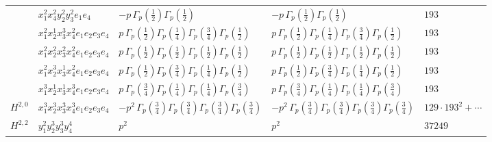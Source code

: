 \documentclass[11pt]{article}
\begin{document}
\begin{table}[ht]
{\begin{tabular}{@{}lllll@{}}
 & $x_{1}^{2} x_{4}^{2} y_{2}^{2} y_{3}^{2} e_{1} e_{4}$ & $- p \, \Gamma_p \left( \frac{1}{2} \right) \Gamma_p \left( \frac{1}{2} \right)$ & $- p \, \Gamma_p \left( \frac{1}{2} \right) \Gamma_p \left( \frac{1}{2} \right)$ & $193$ \\
 & $x_{1}^{2} x_{2}^{1} x_{3}^{3} x_{4}^{2}  e_{1} e_{2} e_{3} e_{4}$ & $p \, \Gamma_p \left( \frac{1}{2} \right) \Gamma_p \left( \frac{1}{4} \right) \Gamma_p \left( \frac{3}{4} \right) \Gamma_p \left( \frac{1}{2} \right)$ & $p \, \Gamma_p \left( \frac{1}{2} \right) \Gamma_p \left( \frac{1}{4} \right) \Gamma_p \left( \frac{3}{4} \right) \Gamma_p \left( \frac{1}{2} \right)$ & $193$ \\
 & $x_{1}^{2} x_{2}^{2} x_{3}^{2} x_{4}^{2}  e_{1} e_{2} e_{3} e_{4}$ & $p \, \Gamma_p \left( \frac{1}{2} \right) \Gamma_p \left( \frac{1}{2} \right) \Gamma_p \left( \frac{1}{2} \right) \Gamma_p \left( \frac{1}{2} \right)$ & $p \, \Gamma_p \left( \frac{1}{2} \right) \Gamma_p \left( \frac{1}{2} \right) \Gamma_p \left( \frac{1}{2} \right) \Gamma_p \left( \frac{1}{2} \right)$ & $193$ \\
 & $x_{1}^{2} x_{2}^{3} x_{3}^{1} x_{4}^{2}  e_{1} e_{2} e_{3} e_{4}$ & $p \, \Gamma_p \left( \frac{1}{2} \right) \Gamma_p \left( \frac{3}{4} \right) \Gamma_p \left( \frac{1}{4} \right) \Gamma_p \left( \frac{1}{2} \right)$ & $p \, \Gamma_p \left( \frac{1}{2} \right) \Gamma_p \left( \frac{3}{4} \right) \Gamma_p \left( \frac{1}{4} \right) \Gamma_p \left( \frac{1}{2} \right)$ & $193$ \\
 & $x_{1}^{3} x_{2}^{1} x_{3}^{1} x_{4}^{3}  e_{1} e_{2} e_{3} e_{4}$ & $p \, \Gamma_p \left( \frac{3}{4} \right) \Gamma_p \left( \frac{1}{4} \right) \Gamma_p \left( \frac{1}{4} \right) \Gamma_p \left( \frac{3}{4} \right)$ & $p \, \Gamma_p \left( \frac{3}{4} \right) \Gamma_p \left( \frac{1}{4} \right) \Gamma_p \left( \frac{1}{4} \right) \Gamma_p \left( \frac{3}{4} \right)$ & $193$ \\
\midrule
$H^{2,0}$ & $x_{1}^{3} x_{2}^{3} x_{3}^{3} x_{4}^{3}  e_{1} e_{2} e_{3} e_{4}$ & $- p^{2} \, \Gamma_p \left( \frac{3}{4} \right) \Gamma_p \left( \frac{3}{4} \right) \Gamma_p \left( \frac{3}{4} \right) \Gamma_p \left( \frac{3}{4} \right)$ & $- p^{2} \, \Gamma_p \left( \frac{3}{4} \right) \Gamma_p \left( \frac{3}{4} \right) \Gamma_p \left( \frac{3}{4} \right) \Gamma_p \left( \frac{3}{4} \right)$ & $129{\cdot}193^{2}{+}\cdots$ \\
\midrule
$H^{2,2}$ & $y_{1}^{2} y_{2}^{3} y_{3}^{3} y_{4}^{4}$ & $p^{2} \,$ & $p^{2} \,$ & $37249$ \\
\bottomrule
\end{tabular}
}
\renewcommand{\arraystretch}{1.0}
\end{table}
\end{document}
